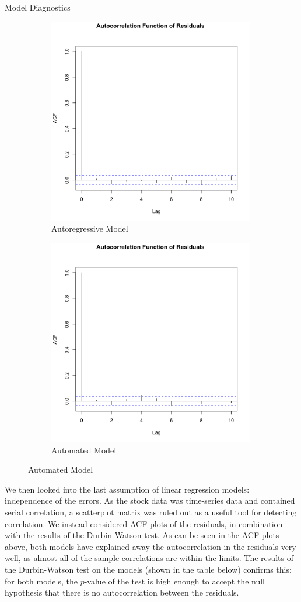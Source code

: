 \documentclass[]{article}
\begin{document}
\begin{section}{Model Diagnostics}
\begin{figure}[h]
\begin{subfigure}{.5\textwidth}
  \includegraphics[width=90mm]{diagnostics/arm_acf_residuals.png}
  \caption{Autoregressive Model}
\end{subfigure}%
\begin{subfigure}{.5\textwidth}
  \includegraphics[width=90mm]{diagnostics/fm_acf_residuals.png}
  \caption{Automated Model}
\end{subfigure}
\end{figure}

We then looked into the last assumption of linear regression models: independence of the errors. As the stock data was time-series data and contained serial correlation, a scatterplot matrix was ruled out as a useful tool for detecting correlation. We instead considered ACF plots of the residuals, in combination with the results of the Durbin-Watson test. As can be seen in the ACF plots above, both models have explained away the autocorrelation in the residuals very well, as almost all of the sample correlations are within the limits. The results of the Durbin-Watson test on the models (shown in the table below) confirms this: for both models, the $p$-value of the test is high enough to accept the null hypothesis that there is no autocorrelation between the residuals.





\end{section}
\end{document}

